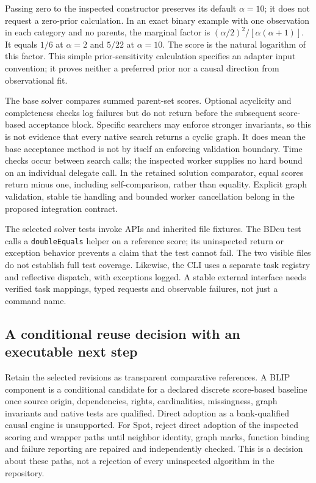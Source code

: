 Passing zero to the inspected constructor preserves its default $\alpha=10$;
it does not request a zero-prior calculation. In an exact binary example with
one observation in each category and no parents, the marginal factor is
$(\alpha/2)^2/[\alpha(\alpha+1)]$. It equals $1/6$ at $\alpha=2$ and $5/22$
at $\alpha=10$. The score is the natural logarithm of this factor. This simple
prior-sensitivity calculation specifies an adapter input convention; it proves
neither a preferred prior nor a causal direction from observational fit.
\citep{exec28_nested_reference}

The base solver compares summed parent-set scores. Optional acyclicity and
completeness checks log failures but do not return before the subsequent
score-based acceptance block. Specific searchers may enforce stronger
invariants, so this is not evidence that every native search returns a cyclic
graph. It does mean the base acceptance method is not by itself an enforcing
validation boundary. Time checks occur between search calls; the inspected
worker supplies no hard bound on an individual delegate call. In the retained
solution comparator, equal scores return minus one, including self-comparison,
rather than equality. Explicit graph validation, stable tie handling and
bounded worker cancellation belong in the proposed integration contract.
\citep{exec28_nested_sources,exec28_nested_reference}

The selected solver tests invoke APIs and inherited file fixtures. The BDeu
test calls a \texttt{doubleEquals} helper on a reference score; its uninspected
return or exception behavior prevents a claim that the test cannot fail. The
two visible files do not establish full test coverage. Likewise, the CLI uses
a separate task registry and reflective dispatch, with exceptions logged. A
stable external interface needs verified task mappings, typed requests and
observable failures, not just a command name.\citep{exec28_nested_sources}

\subsection{A conditional reuse decision with an executable next step}
Retain the selected revisions as transparent comparative references. A BLIP
component is a conditional candidate for a declared discrete score-based
baseline once source origin, dependencies, rights, cardinalities, missingness,
graph invariants and native tests are qualified. Direct adoption as a
bank-qualified causal engine is unsupported. For Spot, reject direct adoption
of the inspected scoring and wrapper paths until neighbor identity, graph
marks, function binding and failure reporting are repaired and independently
checked. This is a decision about these paths, not a rejection of every
uninspected algorithm in the repository.\citep{exec28_nested_sources}

